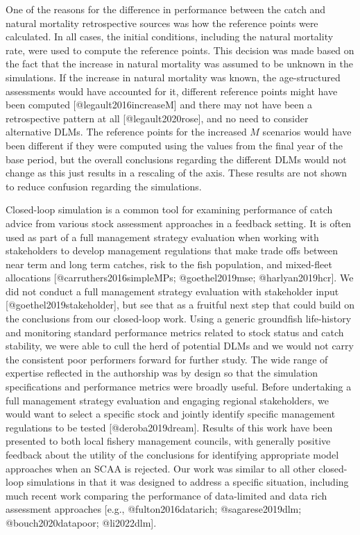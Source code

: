 \documentclass[
  12pt,
]{article}
\begin{document}
One of the reasons for the difference in performance between the catch and natural mortality retrospective sources was how the reference points were calculated. In all cases, the initial conditions, including the natural mortality rate, were used to compute the reference points. This decision was made based on the fact that the increase in natural mortality was assumed to be unknown in the simulations. If the increase in natural mortality was known, the age-structured assessments would have accounted for it, different reference points might have been computed {[}@legault2016increaseM{]} and there may not have been a retrospective pattern at all {[}@legault2020rose{]}, and no need to consider alternative DLMs. The reference points for the increased \(M\) scenarios would have been different if they were computed using the values from the final year of the base period, but the overall conclusions regarding the different DLMs would not change as this just results in a rescaling of the axis. These results are not shown to reduce confusion regarding the simulations.

Closed-loop simulation is a common tool for examining performance of catch advice from various stock assessment approaches in a feedback setting. It is often used as part of a full management strategy evaluation when working with stakeholders to develop management regulations that make trade offs between near term and long term catches, risk to the fish population, and mixed-fleet allocations {[}@carruthers2016simpleMPs; @goethel2019mse; @harlyan2019hcr{]}. We did not conduct a full management strategy evaluation with stakeholder input {[}@goethel2019stakeholder{]}, but see that as a fruitful next step that could build on the conclusions from our closed-loop work. Using a generic groundfish life-history and monitoring standard performance metrics related to stock status and catch stability, we were able to cull the herd of potential DLMs and we would not carry the consistent poor performers forward for further study. The wide range of expertise reflected in the authorship was by design so that the simulation specifications and performance metrics were broadly useful. Before undertaking a full management strategy evaluation and engaging regional stakeholders, we would want to select a specific stock and jointly identify specific management regulations to be tested {[}@deroba2019dream{]}. Results of this work have been presented to both local fishery management councils, with generally positive feedback about the utility of the conclusions for identifying appropriate model approaches when an SCAA is rejected. Our work was similar to all other closed-loop simulations in that it was designed to address a specific situation, including much recent work comparing the performance of data-limited and data rich assessment approaches {[}e.g., @fulton2016datarich; @sagarese2019dlm; @bouch2020datapoor; @li2022dlm{]}.
\end{document}
